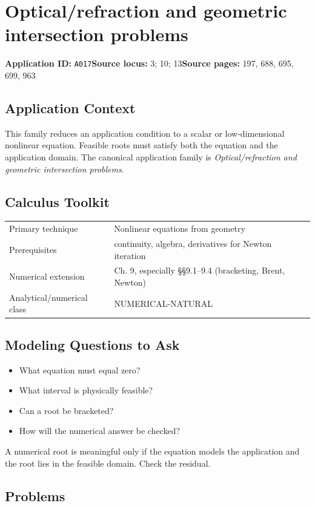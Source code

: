 \documentclass[11pt]{book}
\newcommand{\pid}[1]{\texttt{#1}}
\begin{document}
\chapter{Optical/refraction and geometric intersection problems}\label{app:A017}
\textbf{Application ID:} \pid{A017}\quad \textbf{Source locus:} 3; 10; 13\quad \textbf{Source pages:} 197, 688, 695, 699, 963
\section*{Application Context}
This family reduces an application condition to a scalar or low-dimensional nonlinear equation. Feasible roots must satisfy both the equation and the application domain. The canonical application family is \emph{Optical/refraction and geometric intersection problems}.
\section*{Calculus Toolkit}
\begin{tabularx}{\textwidth}{@{}lX@{}}\toprule
Primary technique & Nonlinear equations from geometry \\
Prerequisites & continuity, algebra, derivatives for Newton iteration \\
Numerical extension & Ch. 9, especially §§9.1–9.4 (bracketing, Brent, Newton) \\
Analytical/numerical class & NUMERICAL-NATURAL \\
\bottomrule\end{tabularx}
\section*{Modeling Questions to Ask}\begin{itemize}
\item What equation must equal zero?
\item What interval is physically feasible?
\item Can a root be bracketed?
\item How will the numerical answer be checked?
\end{itemize}
\begin{errorbox}A numerical root is meaningful only if the equation models the application and the root lies in the feasible domain. Check the residual.\end{errorbox}
\section*{Problems}
\end{document}
